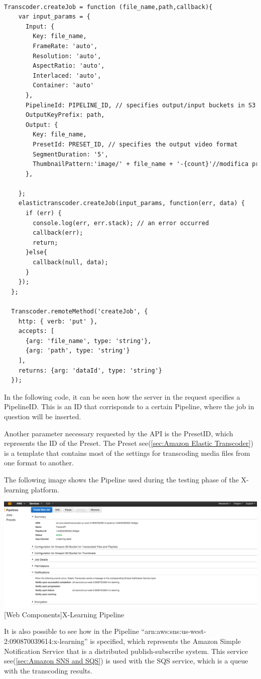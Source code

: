 \begin{lstlisting}[language=html]
  
Transcoder.createJob = function (file_name,path,callback){
    var input_params = {
      Input: { 
        Key: file_name, 
        FrameRate: 'auto', 
        Resolution: 'auto', 
        AspectRatio: 'auto', 
        Interlaced: 'auto', 
        Container: 'auto' 
      }, 
      PipelineId: PIPELINE_ID, // specifies output/input buckets in S3 
      OutputKeyPrefix: path,
      Output: { 
        Key: file_name, 
        PresetId: PRESET_ID, // specifies the output video format
        SegmentDuration: '5',
        ThumbnailPattern:'image/' + file_name + '-{count}'//modifica preset per determinare il numero di immagini
      },

    };    
    elastictranscoder.createJob(input_params, function(err, data) {
      if (err) {
        console.log(err, err.stack); // an error occurred
        callback(err);
        return;
      }else{
        callback(null, data);
      }
    });
  };
  
  Transcoder.remoteMethod('createJob', {
    http: { verb: 'put' },
    accepts: [
      {arg: 'file_name', type: 'string'},
      {arg: 'path', type: 'string'}
    ],
    returns: {arg: 'dataId', type: 'string'}
  });
\end{lstlisting}

In the following code, it can be seen how the server in the request specifies a PipelineID. This is an ID that corrisponds to a certain Pipeline, where the job in question will be inserted.

Another parameter necessary requested by the API is the PresetID, which represents the ID of the Preset. The Preset see(\ref{sec:Amazon Elastic Transcoder}) is a template that contains most of the settings for transcoding media files from one format to another.

The following image shows the Pipeline used during the testing phase of the X-learning platform.

\begin{minipage}{\linewidth}
    \centering
    \includegraphics[width=1.0\linewidth]{images/chapter6/elastic_pipeline.png}
    [Web Components]{X-Learning Pipeline}
\end{minipage}
It is also possible to see how in the Pipeline “arn:aws:sns:us-west-2:090870039614:x-learning” is specified, which represents the Amazon Simple Notification Service that is a distributed publish-subscribe system. 
This service see(\ref{sec:Amazon SNS and SQS}) is used with the SQS service, which is a queue with the transcoding results.

